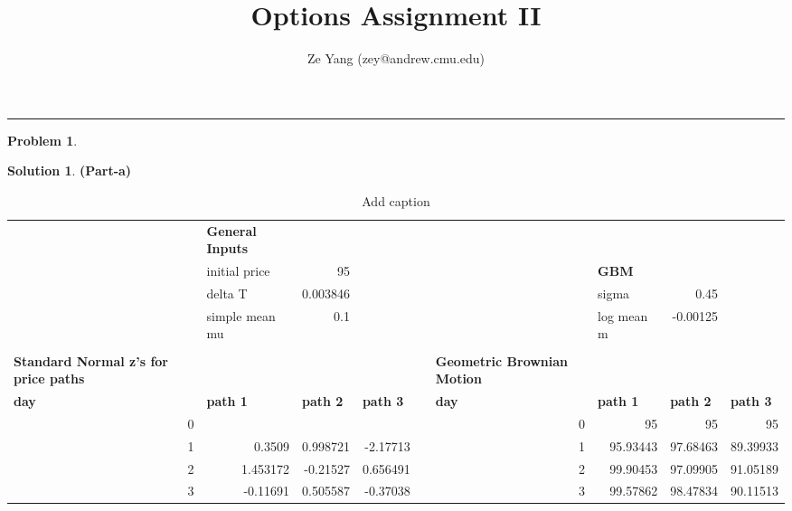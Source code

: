 \documentclass[a4paper, 10pt]{article}
\title{\textbf{Options Assignment II}}
\author{Ze Yang (zey@andrew.cmu.edu)}
\theoremstyle{definition}
\newtheorem{problem}{Problem}
\theoremstyle{hSol}
\newtheorem*{solution}{Solution}
\begin{document}
\maketitle



\noindent\rule{16cm}{0.4pt}

\begin{problem}
\end{problem}
\begin{solution} \textbf{(Part-a)}


\begin{table}[htbp]
  \scriptsize
  \centering
  \caption{Add caption}
    \begin{tabular}{rrrrrrrrr}
          & \multicolumn{1}{l}{\textbf{General Inputs}} &       &       &       &       & \multicolumn{1}{l}{ } &       &  \\
          & \multicolumn{1}{l}{initial price} & 95    &       &       &       & \multicolumn{1}{l}{\textbf{GBM}} &       &  \\
          & \multicolumn{1}{l}{delta T} & 0.003846 &       &       &       & \multicolumn{1}{l}{sigma} & 0.45  &  \\
          & \multicolumn{1}{l}{simple mean mu} & 0.1   &       &       &       & \multicolumn{1}{l}{log mean m} & -0.00125 &  \\
          &       &       &       &       &       &       &       &  \\
    \multicolumn{1}{l}{\textbf{Standard Normal z's for price paths}} &       &       &       &       & \multicolumn{1}{l}{\textbf{Geometric Brownian Motion}} &       &       &  \\
    \multicolumn{1}{l}{\textbf{day}} & \multicolumn{1}{l}{\textbf{path 1}} & \multicolumn{1}{l}{\textbf{path 2}} & \multicolumn{1}{l}{\textbf{path 3}} &       & \multicolumn{1}{l}{\textbf{day}} & \multicolumn{1}{l}{\textbf{path 1}} & \multicolumn{1}{l}{\textbf{path 2}} & \multicolumn{1}{l}{\textbf{path 3}} \\
    \midrule
    0     &       &       &       &       & 0     & 95    & 95    & 95 \\
    1     & 0.3509 & 0.998721 & -2.17713 &       & 1     & 95.93443 & 97.68463 & 89.39933 \\
    2     & 1.453172 & -0.21527 & 0.656491 &       & 2     & 99.90453 & 97.09905 & 91.05189 \\
    3     & -0.11691 & 0.505587 & -0.37038 &       & 3     & 99.57862 & 98.47834 & 90.11513 \\

\end{tabular}
\end{table}
\end{solution}
\end{document}
